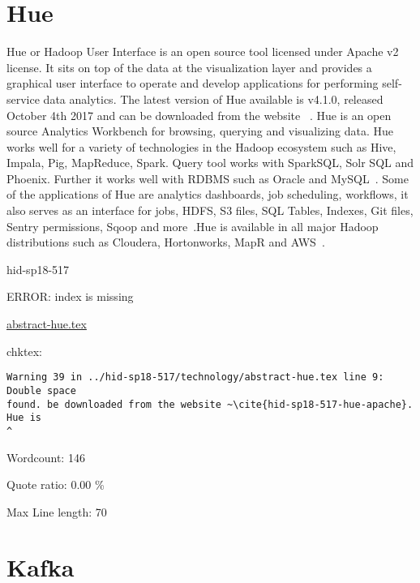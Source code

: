\section{Hue}


Hue or Hadoop User Interface is an open source tool licensed under
Apache v2 license. It sits on top of the data at the visualization
layer and provides a graphical user interface to operate and develop
applications for performing self-service data analytics.  The latest
version of Hue available is v4.1.0, released October 4th 2017 and can
be downloaded from the website ~\cite{hid-sp18-517-hue-apache}. Hue is
an open source Analytics Workbench for browsing, querying and
visualizing data. Hue works well for a variety of technologies in the
Hadoop ecosystem such as Hive, Impala, Pig, MapReduce, Spark. Query
tool works with SparkSQL, Solr SQL and Phoenix. Further it works well
with RDBMS such as Oracle and MySQL~\cite{hid-sp18-517-Hue-wiki}. Some
of the applications of Hue are analytics dashboards, job scheduling,
workflows, it also serves as an interface for jobs, HDFS, S3 files,
SQL Tables, Indexes, Git files, Sentry permissions, Sqoop and
more~\cite{hid-sp18-517-Hue-wiki}.Hue is available in all major Hadoop
distributions such as Cloudera, Hortonworks, MapR and
AWS~\cite{hid-sp18-517-Hue-wiki}.



\begin{IU}

hid-sp18-517

ERROR: index is missing

\href{https://github.com/cloudmesh-community/hid-sp18-517/blob/master//technology/abstract-hue.tex}{abstract-hue.tex}

 
chktex:
\begin{tiny}
\begin{verbatim}
Warning 39 in ../hid-sp18-517/technology/abstract-hue.tex line 9: Double space
found. be downloaded from the website ~\cite{hid-sp18-517-hue-apache}. Hue is
^
\end{verbatim}
\end{tiny}

Wordcount: 146


Quote ratio: 0.00 \%
 
Max Line length: 70
\end{IU}

\section{Kafka}

